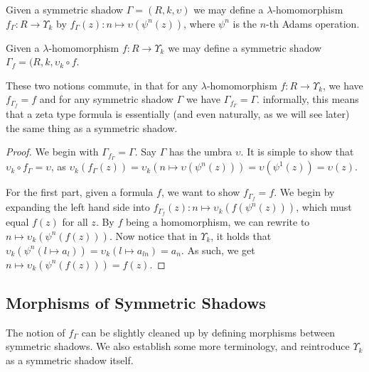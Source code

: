 \begin{propdef}
  Given a symmetric shadow $\Gamma = (R, k, \upsilon)$ we may define a $\lambda$-homomorphism $f_\Gamma : R \to \Upsilon_k$ by $f_\Gamma(z) : n \mapsto \upsilon(\psi^n(z))$, where $\psi^n$ is the $n$-th Adams operation. 
\end{propdef}

\begin{propdef}
  Given a $\lambda$-homomorphism $f : R \to \Upsilon_k$ we may define a symmetric shadow $\Gamma_f = (R, k, \upsilon_k \circ f$.
\end{propdef}

\begin{theorem}
  These two notions commute, in that for any $\lambda$-homomorphism $f : R \to \Upsilon_k$, we have $f_{\Gamma_f} = f$ and for any symmetric shadow $\Gamma$ we have $\Gamma_{f_\Gamma} = \Gamma$. informally, this means that a zeta type formula is essentially (and even naturally, as we will see later) the same thing as a symmetric shadow.
\end{theorem}

\begin{proof}
  We begin with $\Gamma_{f_\Gamma} = \Gamma$. Say $\Gamma$ has the umbra $\upsilon$. It is simple to show that $\upsilon_k \circ f_\Gamma = \upsilon$, as $\upsilon_k(f_\Gamma(z)) = \upsilon_k(n \mapsto \upsilon(\psi^n(z))) = \upsilon(\psi^1(z)) = \upsilon(z)$. 
  
  For the first part, given a formula $f$, we want to show $f_{\Gamma_f} = f$. We begin by expanding the left hand side into $f_{\Gamma_f}(z) : n \mapsto \upsilon_k(f(\psi^n(z)))$, which must equal $f(z)$ for all $z$. By $f$ being a homomorphism, we can rewrite to $n \mapsto \upsilon_k(\psi^n(f(z)))$. Now notice that in $\Upsilon_k$, it holds that $\upsilon_k(\psi^n(l \mapsto a_l)) = \upsilon_k(l \mapsto a_{ln}) = a_n$. As such, we get $n \mapsto \upsilon_k(\psi^n(f(z))) = f(z)$.
\end{proof}

\subsection{Morphisms of Symmetric Shadows}
The notion of $f_\Gamma$ can be slightly cleaned up by defining morphisms between symmetric shadows. We also establish some more terminology, and reintroduce $\Upsilon_k$ as a symmetric shadow itself. 


